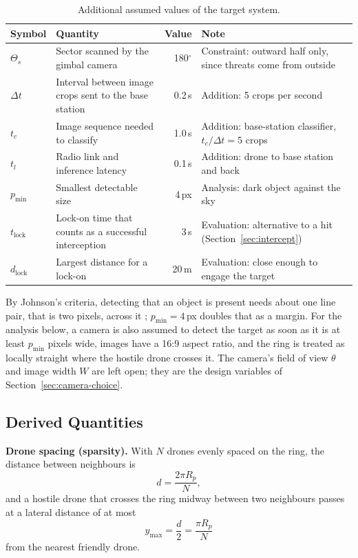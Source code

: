 \begin{table}[H]
\centering
\small
\begin{tabular}{|l|p{}|r|p{}|}
\hline
\textbf{Symbol} & \textbf{Quantity} & \textbf{Value} & \textbf{Note} \\
\hline
$\Theta_s$ & Sector scanned by the gimbal camera & 180$^\circ$ & Constraint: outward half only, since threats come from outside \\
$\Delta t$ & Interval between image crops sent to the base station & 0.2\,s & Addition: 5 crops per second \\
$t_c$ & Image sequence needed to classify & 1.0\,s & Addition: base-station classifier, $t_c/\Delta t = 5$ crops \\
$t_l$ & Radio link and inference latency & 0.1\,s & Addition: drone to base station and back \\
$p_{\min}$ & Smallest detectable size & 4\,px & Analysis: dark object against the sky \\
$t_{\mathrm{lock}}$ & Lock-on time that counts as a successful interception & 3\,s & Evaluation: alternative to a hit (Section~\ref{sec:intercept}) \\
$d_{\mathrm{lock}}$ & Largest distance for a lock-on & 20\,m & Evaluation: close enough to engage the target \\
\hline
\end{tabular}
\caption{Additional assumed values of the target system.}
\label{tab:target-assumptions}
\end{table}

By Johnson's criteria, detecting that an object is present needs about one
line pair, that is two pixels, across it \cite{johnson1958analysis};
$p_{\min} = 4$\,px doubles that as a margin. For the analysis below, a camera
is also assumed to detect the target as soon as it is at least $p_{\min}$
pixels wide, images have a 16:9 aspect ratio, and
the ring is treated as locally straight where the hostile drone crosses it.
The camera's field of view $\theta$ and image width $W$ are left open; they
are the design variables of Section~\ref{sec:camera-choice}.

\subsection{Derived Quantities}
\label{sec:derived}

\textbf{Drone spacing (sparsity).} With $N$ drones evenly spaced on the ring,
the distance between neighbours is
\begin{equation}
  d = \frac{2\pi R_p}{N},
  \label{eq:spacing}
\end{equation}
and a hostile drone that crosses the ring midway between two neighbours passes
at a lateral distance of at most
\begin{equation}
  y_{\max} = \frac{d}{2} = \frac{\pi R_p}{N}
  \label{eq:ymax}
\end{equation}
from the nearest friendly drone.

